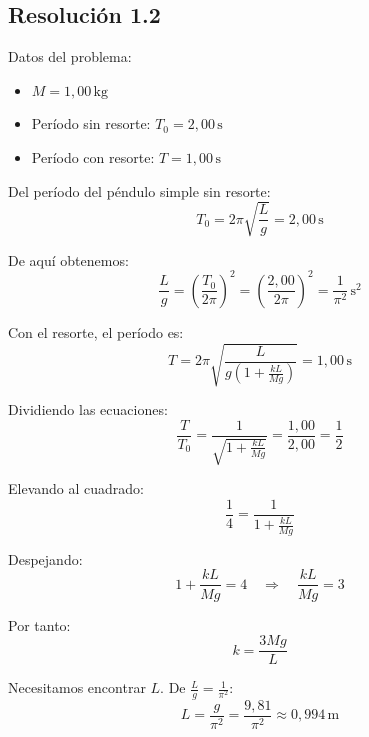 \documentclass[
  11pt,
  letterpaper,
   addpoints,
   answers
  ]{exam}
\begin{document}
\begin{questions}
\begin{solution}
  \subsection*{Resolución 1.2}
  
  Datos del problema:
  \begin{itemize}
    \item $M = 1{,}00\,\mathrm{kg}$
    \item Período sin resorte: $T_0 = 2{,}00\,\mathrm{s}$
    \item Período con resorte: $T = 1{,}00\,\mathrm{s}$
  \end{itemize}
  
  Del período del péndulo simple sin resorte:
  \begin{equation}
    T_0 = 2\pi\sqrt{\frac{L}{g}} = 2{,}00\,\mathrm{s}
  \end{equation}
  
  De aquí obtenemos:
  \begin{equation}
    \frac{L}{g} = \left(\frac{T_0}{2\pi}\right)^2 = \left(\frac{2{,}00}{2\pi}\right)^2 = \frac{1}{\pi^2}\,\mathrm{s^2}
  \end{equation}
  
  Con el resorte, el período es:
  \begin{equation}
    T = 2\pi\sqrt{\frac{L}{g\left(1 + \frac{kL}{Mg}\right)}} = 1{,}00\,\mathrm{s}
  \end{equation}
  
  Dividiendo las ecuaciones:
  \begin{equation}
    \frac{T}{T_0} = \frac{1}{\sqrt{1 + \frac{kL}{Mg}}} = \frac{1{,}00}{2{,}00} = \frac{1}{2}
  \end{equation}
  
  Elevando al cuadrado:
  \begin{equation}
    \frac{1}{4} = \frac{1}{1 + \frac{kL}{Mg}}
  \end{equation}
  
  Despejando:
  \begin{equation}
    1 + \frac{kL}{Mg} = 4 \quad \Rightarrow \quad \frac{kL}{Mg} = 3
  \end{equation}
  
  Por tanto:
  \begin{equation}
    k = \frac{3Mg}{L}
  \end{equation}
  
  Necesitamos encontrar $L$. De $\frac{L}{g} = \frac{1}{\pi^2}$:
  \begin{equation}
    L = \frac{g}{\pi^2} = \frac{9{,}81}{\pi^2} \approx 0{,}994\,\mathrm{m}
  \end{equation}
  

\end{solution}
\end{questions}
\end{document}
